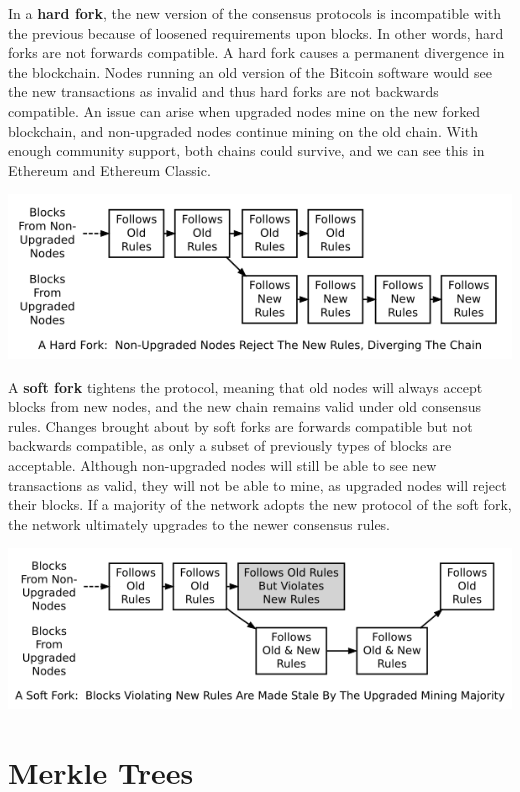 \documentclass[11pt]{article}
\begin{document}
   In a \textbf{hard fork}, the new version of the consensus protocols is incompatible with the previous because of loosened requirements upon blocks. In other words, hard forks are not forwards compatible. A hard fork causes a permanent divergence in the blockchain. Nodes running an old version of the Bitcoin software would see the new transactions as invalid and thus hard forks are not backwards compatible. An issue can arise when upgraded nodes mine on the new forked blockchain, and non-upgraded nodes continue mining on the old chain. With enough community support, both chains could survive, and we can see this in Ethereum and Ethereum Classic.
   
   \smallskip
   \includegraphics[scale=0.9]{hard_fork}
   \smallskip
   
   A \textbf{soft fork} tightens the protocol, meaning that old nodes will always accept blocks from new nodes, and the new chain remains valid under old consensus rules. Changes brought about by soft forks are forwards compatible but not backwards compatible, as only a subset of previously types of blocks are acceptable. Although non-upgraded nodes will still be able to see new transactions as valid, they will not be able to mine, as upgraded nodes will reject their blocks. If a majority of the network adopts the new protocol of the soft fork, the network ultimately upgrades to the newer consensus rules.
   
   \medskip   
   \includegraphics[scale=0.9]{soft_fork}
  
   \section*{Merkle Trees}
  
\end{document}
